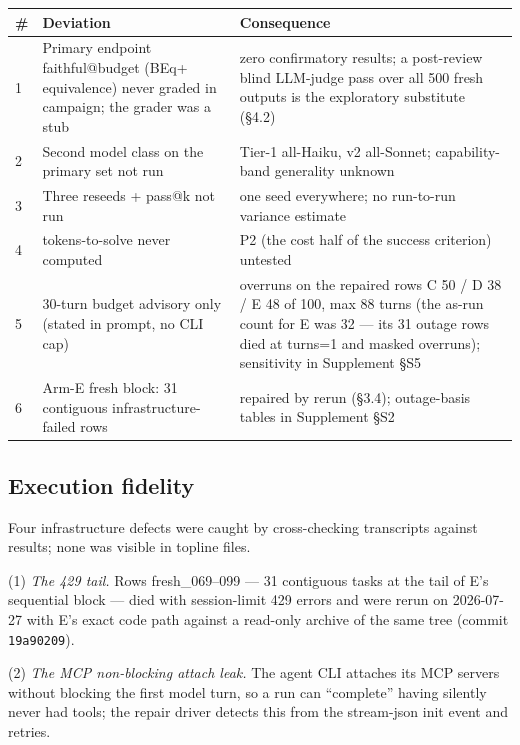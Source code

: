 \documentclass[10pt]{article}
\newcommand{\code}[1]{\texttt{#1}}
\newcommand{\Ssec}[1]{Supplement \S #1}
\begin{document}
\begin{center}\footnotesize
\begin{tabular}{@{}p{}p{}p{}@{}}
\toprule
\# & Deviation & Consequence \\
\midrule
1 & Primary endpoint faithful@budget (BEq+ equivalence) never graded in campaign; the grader was a stub & zero confirmatory results; a post-review blind LLM-judge pass over all 500 fresh outputs is the exploratory substitute (\S 4.2) \\
2 & Second model class on the primary set not run & Tier-1 all-Haiku, v2 all-Sonnet; capability-band generality unknown \\
3 & Three reseeds + pass@k not run & one seed everywhere; no run-to-run variance estimate \\
4 & tokens-to-solve never computed & P2 (the cost half of the success criterion) untested \\
5 & 30-turn budget advisory only (stated in prompt, no CLI cap) & overruns on the repaired rows C 50 / D 38 / E 48 of 100, max 88 turns (the as-run count for E was 32 --- its 31 outage rows died at turns=1 and masked overruns); sensitivity in \Ssec{S5} \\
6 & Arm-E fresh block: 31 contiguous infrastructure-failed rows & repaired by rerun (\S 3.4); outage-basis tables in \Ssec{S2} \\
\bottomrule
\end{tabular}
\end{center}

\subsection{Execution fidelity}\label{sec:fidelity}

Four infrastructure defects were caught by cross-checking transcripts
against results; none was visible in topline files.

(1) \emph{The 429 tail.} Rows fresh\_069--099 --- 31 contiguous tasks at
the tail of E's sequential block --- died with session-limit 429 errors
and were rerun on 2026-07-27 with E's exact code path against a
read-only archive of the same tree (commit \code{19a90209}).

(2) \emph{The MCP non-blocking attach leak.} The agent CLI attaches its
MCP servers without blocking the first model turn, so a run can
``complete'' having silently never had tools; the repair driver detects
this from the stream-json init event and retries.
\end{document}
